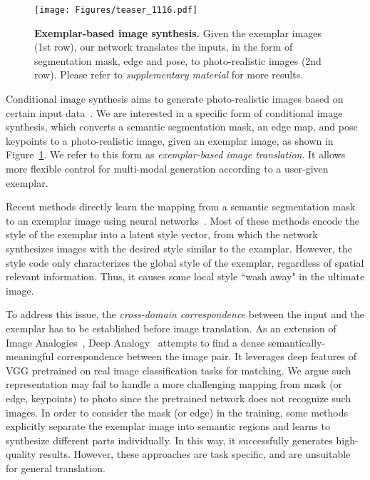 \documentclass[10pt,twocolumn,letterpaper]{article}
\begin{document}
\begin{figure}[t!]
\centering
\small
\setlength\tabcolsep{0pt}
\texttt{[image: Figures/teaser\_1116.pdf]}
\caption{\textbf{Exemplar-based image synthesis.} Given the exemplar images (1st row), our network translates the inputs, in the form of segmentation mask, edge and pose, to photo-realistic images (2nd row). Please refer to \emph{supplementary material} for more results.}
\label{fig:teaser1}
\end{figure}







Conditional image synthesis aims to generate photo-realistic images based on certain input data~\cite{isola2017image,wang2018high,zhu2017unpaired,chen2017photographic}. We are interested in a specific form of conditional image synthesis, which converts a semantic segmentation mask, an edge map, and pose keypoints to a photo-realistic image, given an exemplar image, as shown in Figure~\ref{fig:teaser1}. We refer to this form as \emph{exemplar-based image translation}. It allows more flexible control for multi-modal generation according to a user-given exemplar.


Recent methods directly learn the mapping from a semantic segmentation mask to an exemplar image using neural networks~\cite{huang2018multimodal,park2019semantic,ma2018exemplar,wang2019example}. Most of these methods encode the style of the exemplar into a latent style vector, from which the network synthesizes images with the desired style similar to the examplar. However, the style code only characterizes the global style of the exemplar, regardless of spatial relevant information. Thus, it causes some local style ``wash away" in the ultimate image.

To address this issue, the \emph{cross-domain correspondence} between the input and the exemplar has to be established before image translation. As an extension of Image Analogies~\cite{hertzmann2001image}, Deep Analogy~\cite{liao2017visual} attempts to find a dense semantically-meaningful correspondence between the image pair. It leverages deep features of VGG pretrained on real image classification tasks for matching. We argue such representation may fail to handle a more challenging mapping from mask (or edge, keypoints) to photo since the pretrained network does not recognize such images. In order to consider the mask (or edge) in the training, some methods~\cite{gu2019mask,yi2019apdrawinggan,chang2018pairedcyclegan} explicitly separate the exemplar image into semantic regions and learns to synthesize different parts individually. In this way, it successfully generates high-quality results. However, these approaches are task specific, and are unsuitable for general translation.
\end{document}
